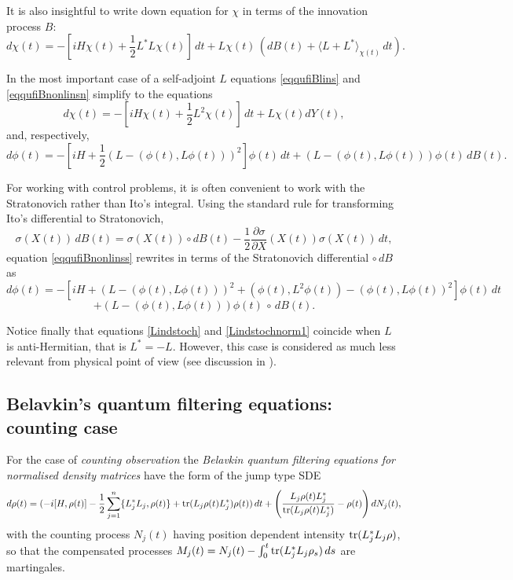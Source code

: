 \documentclass[12pt]{article}
\def\tr{\rm{tr}}
\def\pa{\partial}
\newcommand{\si}{\sigma}
\begin{document}
It is also insightful to write down equation for $\chi$ in terms of the innovation process $B$:
\begin{equation}
\label{eqqufiBlinsB}
d\chi(t) =-[iH\chi(t) +\frac12 L^*L \chi(t) ]\,dt
+L \chi(t) \, (dB(t)+\langle L+L^*\rangle_{\chi(t)} \, dt).
\end{equation}

In the most important case of a self-adjoint $L$ equations
\eqref{eqqufiBlins} and \eqref{eqqufiBnonlinsn} simplify to the equations
\begin{equation}
\label{eqqufiBlinss}
d\chi(t) =-[iH\chi(t) +\frac12 L^2 \chi(t) ]\,dt+L\chi(t) dY(t),
\end{equation}
and, respectively,
\begin{equation}
\label{eqqufiBnonlinss}
d\phi(t)=-[iH+\frac12 (L-(\phi(t), L \phi(t)))^2]\phi(t) \, dt
+ (L-(\phi(t), L \phi(t)))\phi(t) \, dB(t).
\end{equation}

For working with control problems, it is often convenient to work with the Stratonovich rather
than Ito's integral. Using the standard rule for transforming Ito's differential to Stratonovich,
\[
\si(X(t)) \, dB(t)=\si(X(t)) \circ dB(t)-\frac12 \frac{\pa \si}{\pa X}(X(t)) \si(X(t)) \, dt,
\]
equation \eqref{eqqufiBnonlinss} rewrites in terms of the Stratonovich differential $\circ \, dB$ as
\[
d\phi(t)=-[iH+(L-(\phi(t), L \phi(t)))^2 + (\phi(t), L^2 \phi(t))-(\phi(t), L \phi(t))^2 ]\phi(t) \, dt
\]
\begin{equation}
\label{eqqufiBnonlinssStr}
+ (L-(\phi(t), L \phi(t)))\phi(t) \, \circ \, dB(t).
\end{equation}

Notice finally that equations \eqref{Lindstoch} and \eqref{Lindstochnorm1} coincide when $L$ is anti-Hermitian,
that is $L^*=-L$. However, this case is considered as much less relevant from
physical point of view (see discussion in \cite{BarchBook}).

\subsection{Belavkin's quantum filtering equations: counting case}

For the case of {\it counting observation} the {\it Belavkin quantum filtering equations
for normalised density matrices} have the form of the jump type SDE
\begin{equation}
\label{eqBeleqcountj}
d\rho(t)=(- i[H, \rho(t)] -\frac12 \sum_{j=1}^n \{L_j^*L_j,\rho(t)\}+ {\tr} (L_j\rho(t) L_j^*) \rho(t) )\, dt
+\left(\frac{L_j\rho(t) L_j^*}{{\tr} (L_j\rho(t) L_j^*)}-\rho(t)\right) dN_j(t),
\end{equation}
with the counting process $N_j(t)$ having position dependent intensity ${\tr} (L_j^*L_j\rho)$,
so that the compensated processes $M_j(t)=N_j(t)-\int_0^t {\tr} (L_j^*L_j\rho_s) \, ds$ are martingales.
\end{document}
